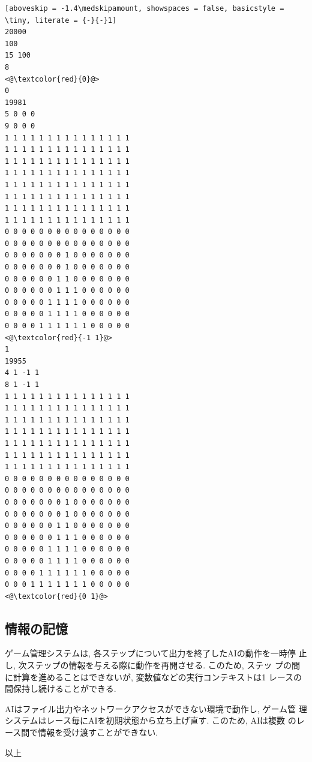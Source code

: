 \documentclass[11pt]{jarticle}
\begin{document}
\hfill
\begin{minipage}[t]{.3\textwidth}
\begin{lstlisting}[aboveskip = -1.4\medskipamount, showspaces = false, basicstyle = \tiny, literate = {-}{-}1]
20000
100
15 100
8
<@\textcolor{red}{0}@>
0
19981
5 0 0 0
9 0 0 0
1 1 1 1 1 1 1 1 1 1 1 1 1 1 1
1 1 1 1 1 1 1 1 1 1 1 1 1 1 1
1 1 1 1 1 1 1 1 1 1 1 1 1 1 1
1 1 1 1 1 1 1 1 1 1 1 1 1 1 1
1 1 1 1 1 1 1 1 1 1 1 1 1 1 1
1 1 1 1 1 1 1 1 1 1 1 1 1 1 1
1 1 1 1 1 1 1 1 1 1 1 1 1 1 1
1 1 1 1 1 1 1 1 1 1 1 1 1 1 1
0 0 0 0 0 0 0 0 0 0 0 0 0 0 0
0 0 0 0 0 0 0 0 0 0 0 0 0 0 0
0 0 0 0 0 0 0 1 0 0 0 0 0 0 0
0 0 0 0 0 0 0 1 0 0 0 0 0 0 0
0 0 0 0 0 0 1 1 0 0 0 0 0 0 0
0 0 0 0 0 0 1 1 1 0 0 0 0 0 0
0 0 0 0 0 1 1 1 1 0 0 0 0 0 0
0 0 0 0 0 1 1 1 1 0 0 0 0 0 0
0 0 0 0 1 1 1 1 1 1 0 0 0 0 0
<@\textcolor{red}{-1 1}@>
1
19955
4 1 -1 1
8 1 -1 1
1 1 1 1 1 1 1 1 1 1 1 1 1 1 1
1 1 1 1 1 1 1 1 1 1 1 1 1 1 1
1 1 1 1 1 1 1 1 1 1 1 1 1 1 1
1 1 1 1 1 1 1 1 1 1 1 1 1 1 1
1 1 1 1 1 1 1 1 1 1 1 1 1 1 1
1 1 1 1 1 1 1 1 1 1 1 1 1 1 1
1 1 1 1 1 1 1 1 1 1 1 1 1 1 1
0 0 0 0 0 0 0 0 0 0 0 0 0 0 0
0 0 0 0 0 0 0 0 0 0 0 0 0 0 0
0 0 0 0 0 0 0 1 0 0 0 0 0 0 0
0 0 0 0 0 0 0 1 0 0 0 0 0 0 0
0 0 0 0 0 0 1 1 0 0 0 0 0 0 0
0 0 0 0 0 0 1 1 1 0 0 0 0 0 0
0 0 0 0 0 1 1 1 1 0 0 0 0 0 0
0 0 0 0 0 1 1 1 1 0 0 0 0 0 0
0 0 0 0 1 1 1 1 1 1 0 0 0 0 0
0 0 0 1 1 1 1 1 1 1 0 0 0 0 0
<@\textcolor{red}{0 1}@>
\end{lstlisting}
\end{minipage}

\subsection{情報の記憶}
ゲーム管理システムは, 各ステップについて出力を終了したAIの動作を一時停
止し, 次ステップの情報を与える際に動作を再開させる.  このため, ステッ
プの間に計算を進めることはできないが, 変数値などの実行コンテキストは1
レースの間保持し続けることができる.

AIはファイル出力やネットワークアクセスができない環境で動作し, ゲーム管
理システムはレース毎にAIを初期状態から立ち上げ直す. このため, AIは複数
のレース間で情報を受け渡すことができない.

\begin{flushright}
以上
\end{flushright}
\end{document}
